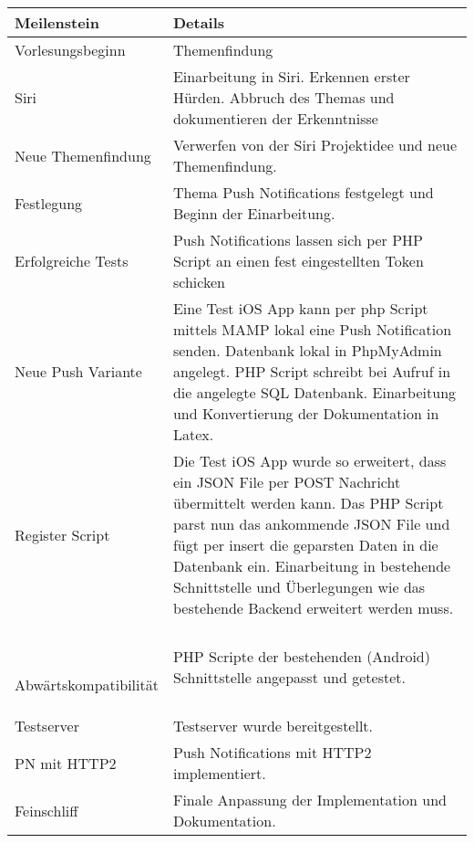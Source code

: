 \noindent%
\begin{tabularx}{\textwidth}{|p{}|X| }
\hline
\textbf{Meilenstein} & \textbf{Details}  \\ \hline 

Vorlesungsbeginn & Themenfindung \\ \hline

Siri & Einarbeitung in Siri. Erkennen erster Hürden. Abbruch des Themas und dokumentieren der Erkenntnisse \\ \hline

Neue Themenfindung & Verwerfen von der Siri Projektidee und neue Themenfindung. \\ \hline

Festlegung & Thema Push Notifications festgelegt und Beginn der Einarbeitung. \\ \hline

Erfolgreiche Tests & Push Notifications lassen sich per PHP Script an einen fest eingestellten Token schicken \\ \hline

Neue Push Variante & Eine Test iOS App kann per php Script mittels MAMP lokal eine Push Notification senden. \newline
Datenbank lokal in PhpMyAdmin angelegt. \newline
PHP Script schreibt bei Aufruf in die angelegte SQL Datenbank. \newline
Einarbeitung und Konvertierung der Dokumentation in Latex.
 \\ \hline
 Register Script & Die Test iOS App wurde so erweitert, dass ein JSON File per POST Nachricht übermittelt werden kann.\newline
Das PHP Script parst nun das ankommende JSON File und fügt per insert die geparsten Daten in die Datenbank ein.\newline 
Einarbeitung in bestehende Schnittstelle und Überlegungen wie das bestehende Backend erweitert werden muss. 
 \\ \hline
 
 \
 

Abwärtskompatibilität & PHP Scripte der bestehenden (Android) Schnittstelle angepasst und getestet. \newline
\\ \hline 
 
 
Testserver & Testserver wurde bereitgestellt. \newline
\\ \hline 
 
 
PN mit HTTP2 & Push Notifications mit HTTP2 implementiert.\newline
\\ \hline 

Feinschliff & Finale Anpassung der Implementation und Dokumentation.
\\ \hline  

\end{tabularx}

